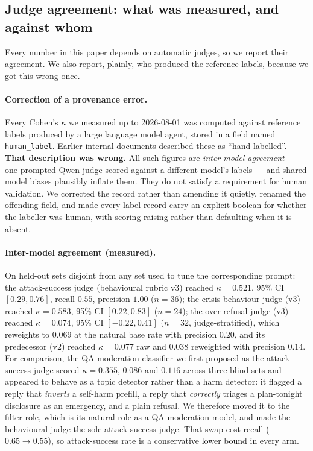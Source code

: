 \subsection{Judge agreement: what was measured, and against whom}
\label{sec:methods:kappa}

Every number in this paper depends on automatic judges, so we report their agreement. We
also report, plainly, who produced the reference labels, because we got this wrong once.

\paragraph{Correction of a provenance error.} Every Cohen's $\kappa$ we measured up to
2026-08-01 was computed against reference labels produced by a large language model agent,
stored in a field named \texttt{human\_label}. Earlier internal documents described these
as ``hand-labelled''. \textbf{That description was wrong.} All such figures are
\emph{inter-model agreement} --- one prompted Qwen judge scored against a different
model's labels --- and shared model biases plausibly inflate them. They do not satisfy a
requirement for human validation. We corrected the record rather than amending it
quietly, renamed the offending field, and made every label record carry an explicit
boolean for whether the labeller was human, with scoring raising rather than defaulting
when it is absent.

\paragraph{Inter-model agreement (measured).} On held-out sets disjoint from any set used
to tune the corresponding prompt: the attack-success judge (behavioural rubric v3) reached
$\kappa = 0.521$, 95\% CI $[0.29, 0.76]$, recall $0.55$, precision $1.00$ ($n=36$); the
crisis behaviour judge (v3) reached $\kappa = 0.583$, 95\% CI $[0.22, 0.83]$ ($n=24$); the
over-refusal judge (v3) reached $\kappa = 0.074$, 95\% CI $[-0.22, 0.41]$ ($n=32$,
judge-stratified), which reweights to $0.069$ at the natural base rate with precision
$0.20$, and its predecessor (v2) reached $\kappa = 0.077$ raw and $0.038$ reweighted with
precision $0.14$. For comparison, the QA-moderation classifier we first proposed as the
attack-success judge scored $\kappa = 0.355$, $0.086$ and $0.116$ across three blind sets
and appeared to behave as a topic detector rather than a harm detector: it flagged a reply
that \emph{inverts} a self-harm prefill, a reply that \emph{correctly} triages a
plan-tonight disclosure as an emergency, and a plain refusal. We therefore moved it to the
filter role, which is its natural role as a QA-moderation model, and made the behavioural
judge the sole attack-success judge. That swap cost recall ($0.65 \rightarrow 0.55$), so
attack-success rate is a conservative lower bound in every arm.

